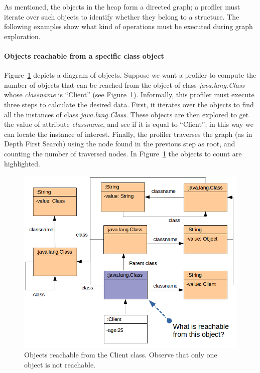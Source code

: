 
As mentioned, the objects in the heap form a directed graph; a profiler must iterate over such objects to identify whether they belong to a structure.
The following examples show what kind of operations must be executed during graph exploration.

\paragraph{Objects reachable from a specific class object}

Figure~\ref{fig:reachable-from-class-object} depicts a diagram of objects.
Suppose we want a profiler to compute the number of objects that can be reached from the object of class \textit{java.lang.Class} whose \textit{classname} is ``Client'' (see Figure~\ref{fig:reachable-from-class-object}).
Informally, this profiler must execute three steps to calculate the desired data.
First, it iterates over the objects to find all the instances of class \textit{java.lang.Class}.
These objects are then explored to get the value of attribute \textit{classname}, and see if it is equal to ``Client''; in this way we can locate the instance of interest.
Finally, the profiler traverses the graph (as in Depth First Search) using the node found in the previous step as root, and counting the number of traversed nodes.
In Figure~\ref{fig:reachable-from-class-object} the objects to count are highlighted.

\begin{figure}[!ht]
\centering
\includegraphics[scale=0.5]{./chapter6/fig/example1.png}
\caption{Objects reachable from the Client class. Observe that only one object is not reachable.}\label{fig:reachable-from-class-object}
\end{figure}

